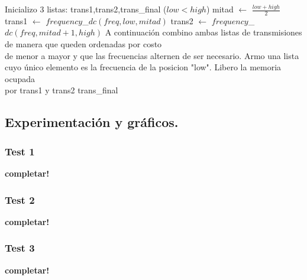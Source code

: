 \begin{codebox}
\li Inicializo 3 listas: trans1,trans2,trans_final
\li \If ($low<high$)
\li	\quad	mitad $\longleftarrow$ $\frac{low + high}{2}$
\li	\quad	trans1 $\longleftarrow$ $frequency$_$dc(freq,low,mitad)$
\li	\quad	trans2 $\longleftarrow$ $frequency$_$dc(freq,mitad+1,high)$
\li	\quad	A continuación combino ambas listas de transmisiones de manera que queden ordenadas por costo
\\ \quad de menor a mayor y que las frecuencias alternen de ser necesario.
\li \Else
\li \quad	Armo una lista cuyo único elemento es la frecuencia de la posicion "low". Libero la memoria ocupada\\ \quad por trans1 y trans2
\li \Return trans_final 
 \end{codebox}


\newpage
\subsection{Experimentación y gráficos.}

\vspace*{0.3cm}

\subsubsection{Test 1}

\vspace*{0.3cm}

\textbf{completar!}


\newpage
\subsubsection{Test 2}

\vspace*{0.3cm}

\textbf{completar!}


\newpage
\subsubsection{Test 3}

\vspace*{0.3cm}

\textbf{completar!}
